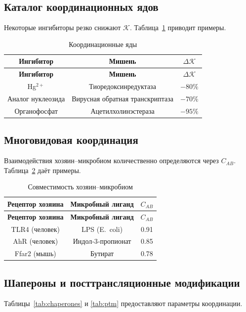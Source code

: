 \documentclass[12pt,a4paper]{article}
\newcommand{\REL}{\mathcal{K}}          %
\begin{document}
	\subsection{Каталог координационных ядов}
	Некоторые ингибиторы резко снижают \(\REL\). Таблица~\ref{tab:poisons} приводит примеры.
	
	\begin{longtable}{|c|c|c|}
		\caption{Координационные яды}\label{tab:poisons}\\
		\hline
		\textbf{Ингибитор} & \textbf{Мишень} & \(\Delta \REL\) \\
		\hline
		\endfirsthead
		\hline
		\textbf{Ингибитор} & \textbf{Мишень} & \(\Delta \REL\) \\
		\hline
		\endhead
		\hline
		Hg\(^{2+}\) & Тиоредоксинредуктаза & \(-80\%\) \\
		Аналог нуклеозида & Вирусная обратная транскриптаза & \(-70\%\) \\
		Органофосфат & Ацетилхолинэстераза & \(-95\%\) \\
		\hline
	\end{longtable}
	
	\subsection{Многовидовая координация}
	Взаимодействия хозяин–микробиом количественно определяются через \(C_{AB}\). Таблица~\ref{tab:microbiome} даёт примеры.
	
	\begin{longtable}{|c|c|c|}
		\caption{Совместимость хозяин–микробиом}\label{tab:microbiome}\\
		\hline
		\textbf{Рецептор хозяина} & \textbf{Микробный лиганд} & \(C_{AB}\) \\
		\hline
		\endfirsthead
		\hline
		\textbf{Рецептор хозяина} & \textbf{Микробный лиганд} & \(C_{AB}\) \\
		\hline
		\endhead
		\hline
		TLR4 (человек) & LPS (E.\ coli) & 0.91 \\
		AhR (человек) & Индол‑3‑пропионат & 0.85 \\
		Ffar2 (мышь) & Бутират & 0.78 \\
		\hline
	\end{longtable}
	
	\subsection{Шапероны и посттрансляционные модификации}
	Таблицы~\ref{tab:chaperones} и \ref{tab:ptm} предоставляют параметры координации.
	
\end{document}
